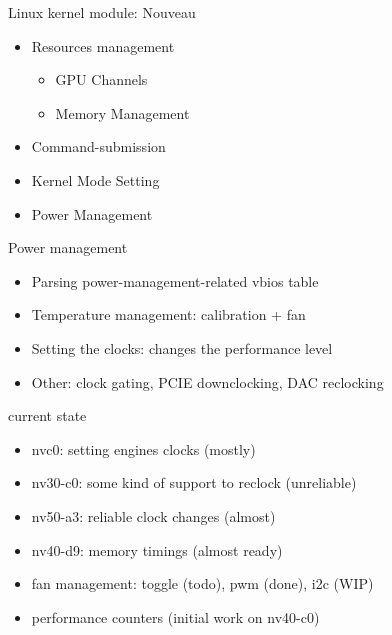 \documentclass[11pt,english,compress]{beamer}
\begin{document}
		\begin{frame}
			\begin{block}{Linux kernel module: Nouveau}
				\begin{itemize}
					\item Resources management
						\begin{itemize}
							\item GPU Channels
							\item Memory Management
						\end{itemize}
					\item Command-submission
					\item Kernel Mode Setting
					\item Power Management
				\end{itemize}
			\end{block}
		\end{frame}

		\begin{frame}
			\begin{block}{Power management}
 				\begin{itemize}
					\item Parsing power-management-related vbios table
					\item Temperature management: calibration + fan
					\item Setting the clocks: changes the performance level
					\item Other: clock gating, PCIE downclocking, DAC reclocking
				\end{itemize}
			\end{block}

			\begin{block}{current state}
				\begin{itemize}
					\item nvc0: setting engines clocks (mostly)
					\item nv30-c0: some kind of support to reclock (unreliable)
					\item nv50-a3: reliable clock changes (almost)
					\item nv40-d9: memory timings (almost ready)
					\item fan management: toggle (todo), pwm (done), i2c (WIP)
					\item performance counters (initial work on nv40-c0)
				\end{itemize}
			\end{block}
		\end{frame}
\end{document}
